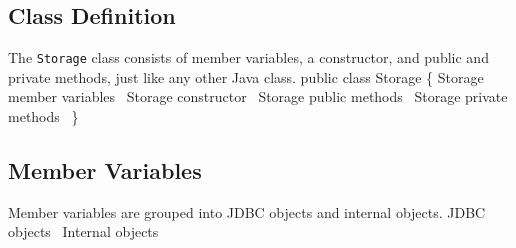 \documentclass{article}
\def\nwendcode{\endtrivlist \endgroup}
\let\nwdocspar=\par
\theoremstyle{definition}
\begin{document}
\subsection{Class Definition}
\label{sec:class-definition}
The {\tt{}Storage} class consists of member variables, a constructor, and public
and private methods, just like any other Java class.
\nwenddocs{}\endmoddef{}
public class Storage \{
  \LA{}\code{}Storage\edoc{} member variables~{\nwtagstyle{}}\RA{}
  \LA{}\code{}Storage\edoc{} constructor~{\nwtagstyle{}}\RA{}
  \LA{}\code{}Storage\edoc{} public methods~{\nwtagstyle{}}\RA{}
  \LA{}\code{}Storage\edoc{} private methods~{\nwtagstyle{}}\RA{}
\}
\nwendcode{}\nwdocspar

\subsection{Member Variables}
\label{sec:member-variables}
Member variables are grouped into JDBC objects and internal objects.
\nwenddocs{}\endmoddef{}
\LA{}JDBC objects~{\nwtagstyle{}}\RA{}
\LA{}Internal objects~{\nwtagstyle{}}\RA{}
\nwendcode{}\nwdocspar
\end{document}
